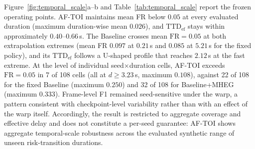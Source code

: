 \documentclass[a4paper,fleqn]{cas-dc}
\begin{document}
{Figure~\ref{fig:temporal_scale}a--b and Table~\ref{tab:temporal_scale}
report the frozen operating points. \mbox{AF-TOI} maintains mean FR below
$0.05$ at every evaluated duration (maximum duration-wise mean $0.026$),
and $\mathrm{TTD}_{\mathrm{ef}}$ stays within
approximately $0.40$--$0.66$\,s. The Baseline crosses mean
$\mathrm{FR}=0.05$ at both extrapolation extremes (mean FR $0.097$ at $0.21$\,s and $0.085$ at
$5.21$\,s for the fixed policy), and its $\mathrm{TTD}_{\mathrm{ef}}$
follows a U-shaped profile that reaches $2.12$\,s at the fast extreme. At
the level of individual seed$\times$duration cells, \mbox{AF-TOI} exceeds
$\mathrm{FR}=0.05$ in 7 of 108 cells (all at $d\ge3.23$\,s, maximum
$0.108$), against 22 of 108 for the fixed Baseline (maximum $0.250$) and 32
of 108 for Baseline+MHEG (maximum $0.333$). Frame-level F1 remained
seed-sensitive under the warp, a pattern consistent with checkpoint-level
variability rather than with an effect of the warp itself. Accordingly, the result is restricted to
aggregate coverage and effective delay and does not constitute a per-seed
guarantee: \mbox{AF-TOI} shows aggregate temporal-scale robustness across
the evaluated synthetic range of unseen risk-transition durations.

}
\end{document}
